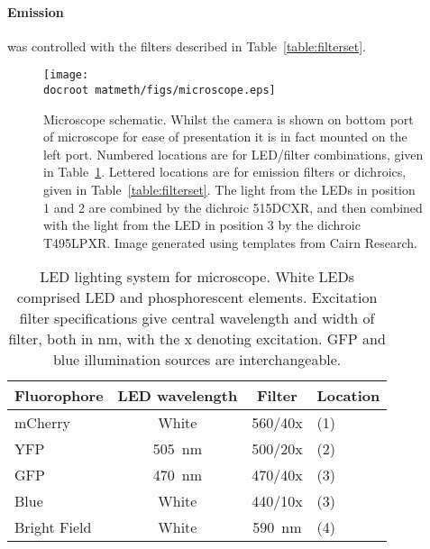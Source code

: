 \documentclass[../main.tex]{subfiles}
\begin{document}
\paragraph{Emission} was controlled with the filters described in Table~\ref{table:filterset}.
\begin{figure}[p]
\begin{center}
\texttt{[image: \\docroot matmeth/figs/microscope.eps]}
\caption[Microscope schematic]{Microscope schematic. Whilst the camera is shown on bottom port of microscope for ease of presentation it is in fact mounted on the left port. Numbered locations are for LED/filter combinations, given in Table~\ref{table:ledlighting}. Lettered locations are for emission filters or dichroics,  given in Table~\ref{table:filterset}. The light from the LEDs in position 1 and 2 are combined by the dichroic 515DCXR, and then combined with the light from the LED in position 3 by the dichroic T495LPXR. Image generated using templates from Cairn Research.}
\label{fig:microscope}
\end{center}
\end{figure}
\begin{table}[p]
\begin{center}
\begin{tabular}{l|c|c|l}
\textbf{Fluorophore}	&	\textbf{LED wavelength}	&	\textbf{Filter}	&	\textbf{Location} \\\hline
mCherry	&	White	&	560/40x	&	(1)	\\
YFP		&	\SI{505}{\nano\meter}		&	500/20x	&	(2)\\
GFP		&	\SI{470}{\nano\meter}		&	470/40x	&	(3)\\
Blue		&	White	&	440/10x	&	(3)\\
Bright Field		&	White	&	\SI{590}{\nano\meter}	&	(4)
\end{tabular}
\caption[LED lighting system]{LED lighting system for microscope. White LEDs comprised LED and phosphorescent elements. Excitation filter specifications give central wavelength and width of filter, both in \si{\nano\meter}, with the x denoting excitation. GFP and blue illumination sources are interchangeable.}
\label{table:ledlighting}
\end{center}
\end{table}
\end{document}
